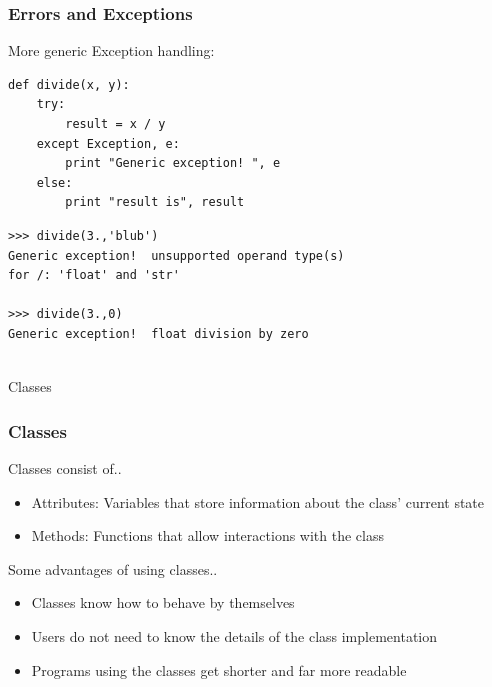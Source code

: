 \begin{frame}[fragile]
\frametitle{Errors and Exceptions}
More generic Exception handling:
\begin{myColorBox}{1.0}{}
\begin{verbatim}
def divide(x, y):
    try:
        result = x / y
    except Exception, e:
        print "Generic exception! ", e
    else:
        print "result is", result
\end{verbatim}
\end{myColorBox}
    \begin{myColorBox}{1.0}{}
    \begin{verbatim}
>>> divide(3.,'blub')
Generic exception!  unsupported operand type(s) 
for /: 'float' and 'str'

>>> divide(3.,0)
Generic exception!  float division by zero
 
\end{verbatim}
\end{myColorBox}
\end{frame}

\begin{frame}
    \begin{center}
    \Huge{Classes}
    \end{center}
\end{frame}


\begin{frame}[fragile]
    \frametitle{Classes}
    Classes consist of..
    \begin{itemize}
    \item Attributes: Variables that store information about the class' current
    state
    \item Methods: Functions that allow interactions with the class
    \end{itemize}
    Some advantages of using classes..
    \begin{itemize}
    \item Classes know how to behave by themselves
    \item Users do not need to know the details of the class implementation
    \item Programs using the classes get shorter and far more readable
    \end{itemize}
\end{frame}

